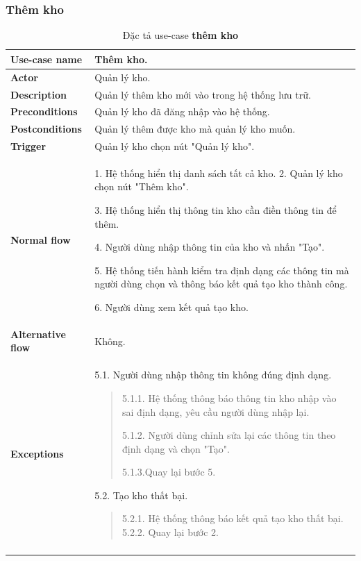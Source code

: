 \subsubsection{Thêm kho}
{
    \setlength\extrarowheight{6pt}
    \begin{longtable}{| p{} | p{} |}
        \hline
        \textbf{Use-case name}
         &
        Thêm kho.
        \\
        \hline
        \textbf{Actor}
         &
        Quản lý kho.
        \\
        \hline
        \textbf{Description}
         &
        Quản lý thêm kho mới vào trong hệ thống lưu trữ.
        \\
        \hline
        \textbf{Preconditions}
         &
        Quản lý kho đã đăng nhập vào hệ thống.
        \\
        \hline
        \textbf{Postconditions}
         &
        Quản lý thêm được kho mà quản lý kho muốn.
        \\
        \hline
        \textbf{Trigger}
         &
        Quản lý kho chọn nút "Quản lý kho".
        \\
        \hline
        \begin{flushleft}
            \textbf{Normal flow}
        \end{flushleft}
         &
        1. Hệ thống hiển thị danh sách tất cả kho.
        2. Quản lý kho chọn nút "Thêm kho".

        3. Hệ thống hiển thị thông tin kho cần điền thông tin để thêm.

        4. Người dùng nhập thông tin của kho và nhấn "Tạo".

        5. Hệ thống tiến hành kiểm tra định dạng các thông tin mà người dùng chọn và thông báo kết quả tạo kho thành công.

        6. Người dùng xem kết quả tạo kho.
        \\
        \hline
        \textbf{Alternative flow}
         &
        Không.
        \\
        \hline
        \textbf{Exceptions}
         &
        5.1. Người dùng nhập thông tin không đúng định dạng.
        \begin{quote}
            5.1.1. Hệ thống thông báo thông tin kho nhập vào sai định dạng, yêu cầu người dùng nhập lại.

            5.1.2. Người dùng chỉnh sửa lại các thông tin theo định dạng và chọn "Tạo".

            5.1.3.Quay lại bước 5.
        \end{quote}
        5.2. Tạo kho thất bại.
        \begin{quote}
            5.2.1. Hệ thống thông báo kết quả tạo kho thất bại.
            5.2.2. Quay lại bước 2.
        \end{quote}
        \\
        \hline
        \caption{Đặc tả use-case \textbf{thêm kho}}
    \end{longtable}
}

